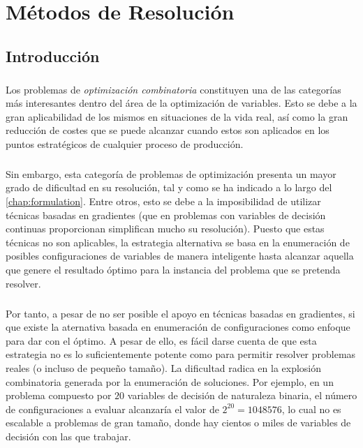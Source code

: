 \documentclass{subfiles}
\begin{document}
  \chapter{Métodos de Resolución}
  \label{chap:solving}

    \section{Introducción}
    \label{sec:solving_introduction}

      \paragraph{}
      Los problemas de \emph{optimización combinatoria} constituyen una de las categorías más interesantes dentro del área de la optimización de variables. Esto se debe a la gran aplicabilidad de los mismos en situaciones de la vida real, así como la gran reducción de costes que se puede alcanzar cuando estos son aplicados en los puntos estratégicos de cualquier proceso de producción.

      \paragraph{}
      Sin embargo, esta categoría de problemas de optimización presenta un mayor grado de dificultad en su resolución, tal y como se ha indicado a lo largo del \cref{chap:formulation}. Entre otros, esto se debe a la imposibilidad de utilizar técnicas basadas en gradientes (que en problemas con variables de decisión continuas proporcionan simplifican mucho su resolución). Puesto que estas técnicas no son aplicables, la estrategia alternativa se basa en la enumeración de posibles configuraciones de variables de manera inteligente hasta alcanzar aquella que genere el resultado óptimo para la instancia del problema que se pretenda resolver.

      \paragraph{}
      Por tanto, a pesar de no ser posible el apoyo en técnicas basadas en gradientes, si que existe la aternativa basada en enumeración de configuraciones como enfoque para dar con el óptimo. A pesar de ello, es fácil darse cuenta de que esta estrategia no es lo suficientemente potente como para permitir resolver problemas reales (o incluso de pequeño tamaño). La dificultad radica en la explosión combinatoria generada por la enumeración de soluciones. Por ejemplo, en un problema compuesto por $20$ variables de decisión de naturaleza binaria, el número de configuraciones a evaluar alcanzaría el valor de $2^{20} = 1048576$, lo cual no es escalable a problemas de gran tamaño, donde hay cientos o miles de variables de decisión con las que trabajar.
\end{document}
